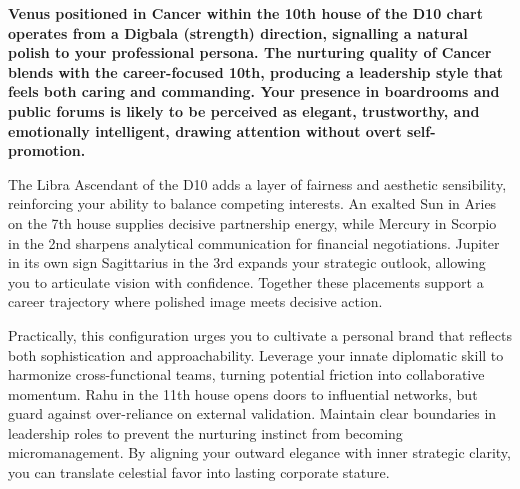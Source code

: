 \label{topic28}

{\fontsize{9.5}{13.8}\selectfont\bfseries\color{DeepSlate} Venus positioned in Cancer within the 10th house of the D10 chart operates from a Digbala (strength) direction, signalling a natural polish to your professional persona. The nurturing quality of Cancer blends with the career-focused 10th, producing a leadership style that feels both caring and commanding. Your presence in boardrooms and public forums is likely to be perceived as elegant, trustworthy, and emotionally intelligent, drawing attention without overt self-promotion.}\par\vspace{2mm}

{\fontsize{9}{13}\selectfont The Libra Ascendant of the D10 adds a layer of fairness and aesthetic sensibility, reinforcing your ability to balance competing interests. An exalted Sun in Aries on the 7th house supplies decisive partnership energy, while Mercury in Scorpio in the 2nd sharpens analytical communication for financial negotiations. Jupiter in its own sign Sagittarius in the 3rd expands your strategic outlook, allowing you to articulate vision with confidence. Together these placements support a career trajectory where polished image meets decisive action.}\par\vspace{1.8mm}

{\fontsize{9}{13}\selectfont Practically, this configuration urges you to cultivate a personal brand that reflects both sophistication and approachability. Leverage your innate diplomatic skill to harmonize cross-functional teams, turning potential friction into collaborative momentum. Rahu in the 11th house opens doors to influential networks, but guard against over-reliance on external validation. Maintain clear boundaries in leadership roles to prevent the nurturing instinct from becoming micromanagement. By aligning your outward elegance with inner strategic clarity, you can translate celestial favor into lasting corporate stature.}\par\vspace{1.8mm}

